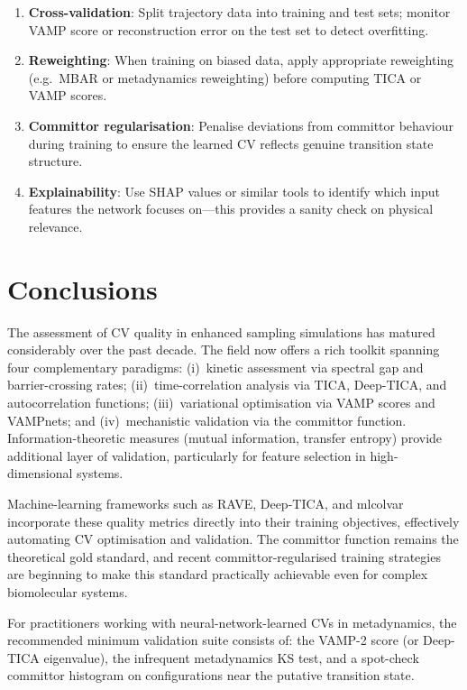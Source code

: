 \documentclass[12pt, a4paper]{article}
\begin{document}
\begin{enumerate}[noitemsep]
  \item \textbf{Cross-validation}: Split trajectory data into 
        training and test sets; monitor VAMP score or reconstruction 
        error on the test set to detect overfitting.
  \item \textbf{Reweighting}: When training on biased data, apply 
        appropriate reweighting (e.g.\ MBAR or metadynamics 
        reweighting) before computing TICA or VAMP scores.
  \item \textbf{Committor regularisation}: Penalise deviations from 
        committor behaviour during training to ensure the learned CV 
        reflects genuine transition state structure.
  \item \textbf{Explainability}: Use SHAP values or similar 
        tools to identify which input features the network focuses 
        on---this provides a sanity check on physical relevance.
\end{enumerate}

\section{Conclusions}

The assessment of CV quality in enhanced sampling simulations has 
matured considerably over the past decade.  The field now offers a 
rich toolkit spanning four complementary paradigms: 
(i)~kinetic assessment via spectral gap and barrier-crossing rates; 
(ii)~time-correlation analysis via TICA, Deep-TICA, and autocorrelation 
functions; (iii)~variational optimisation via VAMP scores and VAMPnets; 
and (iv)~mechanistic validation via the committor function.  
Information-theoretic measures (mutual information, transfer entropy) 
provide additional layer of validation, particularly for feature 
selection in high-dimensional systems.

Machine-learning frameworks such as RAVE, Deep-TICA, and mlcolvar 
incorporate these quality metrics directly into their training 
objectives, effectively automating CV optimisation and validation. 
The committor function remains the theoretical gold standard, and 
recent committor-regularised training strategies are beginning to 
make this standard practically achievable even for complex 
biomolecular systems.

For practitioners working with neural-network-learned CVs in 
metadynamics, the recommended minimum validation suite consists of: 
the VAMP-2 score (or Deep-TICA eigenvalue), the infrequent metadynamics 
KS test, and a spot-check committor histogram on configurations 
near the putative transition state.
\end{document}
